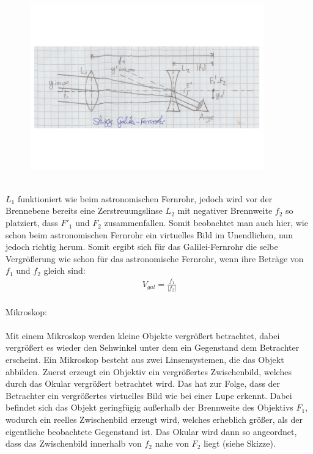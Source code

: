 \documentclass[a4paper,10pt]{scrartcl}
\begin{document}
				\begin{figure}[h]
\centering
\includegraphics[width=0.9\textwidth]{./Bilder/og6}
\end{figure}
\FloatBarrier
			\\
			\(L_{1}\) funktioniert wie beim astronomischen Fernrohr, jedoch wird vor der Brennebene bereits eine Zerstreuungslinse \(L_{2}\) mit negativer Brennweite \(f_{2}\) so platziert, dass \(F'_{1}\) und \(F_{2}\) zusammenfallen. Somit beobachtet man auch hier, wie schon beim astronomischen Fernrohr ein virtuelles Bild im Unendlichen, nun jedoch richtig herum. Somit ergibt sich für das Galilei-Fernrohr die selbe Vergrößerung wie schon für das astronomische Fernrohr, wenn ihre Beträge von \(f_{1}\) und \(f_{2}\) gleich sind:
			\begin{align*}
			V_{gal}=\frac{f_{1}}{|f_{2}|}
			\end{align*}
			\\
			Mikroskop:\\
			\\
			Mit einem Mikroskop werden kleine Objekte vergrößert betrachtet, dabei vergrößert es wieder den Sehwinkel unter dem ein Gegenstand dem Betrachter erscheint. Ein Mikroskop besteht aus zwei Linsensystemen, die das Objekt abbilden. Zuerst erzeugt ein Objektiv ein vergrößertes Zwischenbild, welches durch das Okular vergrößert betrachtet wird. Das hat zur Folge, dass der Betrachter ein vergrößertes virtuelles Bild wie bei einer Lupe erkennt. Dabei befindet sich das Objekt geringfügig außerhalb der Brennweite des Objektivs \(F_{1}\), wodurch ein reelles Zwischenbild erzeugt wird, welches erheblich größer, als der eigentliche beobachtete Gegenstand ist. Das Okular wird dann so angeordnet, dass das Zwischenbild innerhalb von \(f_{2}\) nahe von \(F_{2}\) liegt (siehe Skizze).\\
\end{document}
